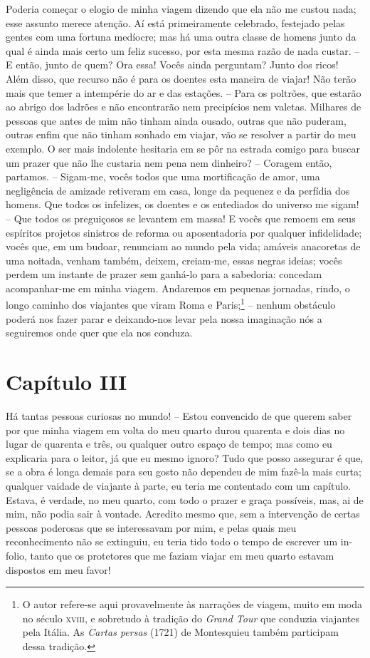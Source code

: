  Poderia começar o elogio de minha viagem dizendo que ela não me custou
nada; esse assunto merece atenção. Aí está primeiramente celebrado,
festejado pelas gentes com uma fortuna medíocre; mas há uma outra
classe de homens junto da qual é ainda mais certo um feliz sucesso, por
esta mesma razão de nada custar. -- E então, junto de quem? Ora essa!
Vocês ainda perguntam? Junto dos ricos! Além disso, que recurso não é
para os doentes esta maneira de viajar! Não terão mais que temer a
intempérie do ar e das estações. -- Para os poltrões, que estarão ao
abrigo dos ladrões e não encontrarão nem precipícios nem valetas.
Milhares de pessoas que antes de mim não tinham ainda ousado, outras
que não puderam, outras enfim que não tinham sonhado em viajar, vão se
resolver a partir do meu exemplo. O ser mais indolente hesitaria em se
pôr na estrada comigo para buscar um prazer que não lhe custaria nem
pena nem dinheiro? -- Coragem então, partamos. -- Sigam-me, vocês
todos que uma mortificação de amor, uma negligência de amizade
retiveram em casa, longe da pequenez e da perfídia dos homens. Que
todos os infelizes, os doentes e os entediados do universo me sigam!
-- Que todos os preguiçosos se levantem em massa! E vocês que remoem
em seus espíritos projetos sinistros de reforma ou aposentadoria por
qualquer infidelidade; vocês que, em um budoar, renunciam ao mundo pela
vida; amáveis anacoretas de uma noitada, venham também, deixem,
creiam-me, essas negras ideias; vocês perdem um instante de prazer sem
ganhá-lo para a sabedoria: concedam acompanhar-me em minha viagem.
Andaremos em pequenas jornadas, rindo, o longo caminho dos viajantes
que viram Roma e Paris;\footnote{ O autor refere-se aqui provavelmente
às narrações de viagem, muito em moda no século \textsc{xviii}, e sobretudo à
tradição do \textit{Grand Tour} que conduzia viajantes pela Itália. As
\textit{Cartas persas} (1721) de Montesquieu também participam dessa
tradição.} -- nenhum obstáculo poderá nos fazer parar e
deixando-nos levar pela nossa imaginação nós a seguiremos onde quer que
ela nos conduza.

\section{Capítulo III}

Há tantas pessoas curiosas no mundo! -- Estou convencido de que querem
saber por que minha viagem em volta do meu quarto durou quarenta e dois
dias no lugar de quarenta e três, ou qualquer outro espaço de tempo;
mas como eu explicaria para o leitor, já que eu mesmo ignoro? Tudo que
posso assegurar é que, se a obra é longa demais para seu gosto não
dependeu de mim fazê-la mais curta; qualquer vaidade de viajante à
parte, eu teria me contentado com um capítulo. Estava, é verdade, no
meu quarto, com todo o prazer e graça possíveis, mas, ai de mim, não
podia sair à vontade. Acredito mesmo que, sem a intervenção de certas
pessoas poderosas que se interessavam por mim, e pelas quais meu
reconhecimento não se extinguiu, eu teria tido todo o tempo de escrever
um in-folio, tanto que os protetores que me faziam viajar em meu quarto
estavam dispostos em meu favor!

